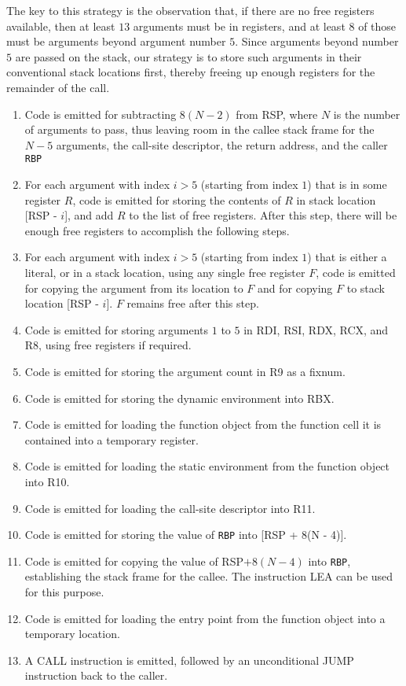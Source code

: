 The key to this strategy is the observation that, if there are no
free registers available, then at least $13$ arguments must be in
registers, and at least $8$ of those must be arguments beyond argument
number $5$.  Since arguments beyond number $5$ are passed on the
stack, our strategy is to store such arguments in their conventional
stack locations first, thereby freeing up enough registers for the
remainder of the call.

\begin{enumerate}
\item Code is emitted for subtracting $8(N - 2)$ from RSP, where $N$
  is the number of arguments to pass, thus leaving room in the callee
  stack frame for the $N - 5$ arguments, the call-site descriptor, the
  return address, and the caller \texttt{RBP}
\item For each argument with index $i > 5$ (starting from index $1$)
  that is in some register $R$, code is emitted for storing the
  contents of $R$ in stack location [RSP - $i$], and add $R$ to the
  list of free registers.  After this step, there will be enough free
  registers to accomplish the following steps.
\item For each argument with index $i > 5$ (starting from index $1$)
  that is either a literal, or in a stack location, using any single
  free register $F$, code is emitted for copying the argument from its
  location to $F$ and for copying $F$ to stack location [RSP - $i$].
  $F$ remains free after this step.
\item Code is emitted for storing arguments $1$ to $5$ in RDI, RSI,
  RDX, RCX, and R8, using free registers if required.
\item Code is emitted for storing the argument count in R9 as a fixnum.
\item Code is emitted for storing the dynamic environment into RBX.
\item Code is emitted for loading the function object from the
  function cell it is contained into a temporary register.
\item Code is emitted for loading the static environment from the
  function object into R10.
\item Code is emitted for loading the call-site descriptor into R11.
\item Code is emitted for storing the value of \texttt{RBP} into [RSP
  + 8(N - 4)].
\item Code is emitted for copying the value of RSP$ + 8(N - 4)$ into
  \texttt{RBP}, establishing the stack frame for the callee.  The
  instruction LEA can be used for this purpose.
\item Code is emitted for loading the entry point from the function
  object into a temporary location.
\item A CALL instruction is emitted, followed by an unconditional JUMP
  instruction back to the caller.
\end{enumerate}

